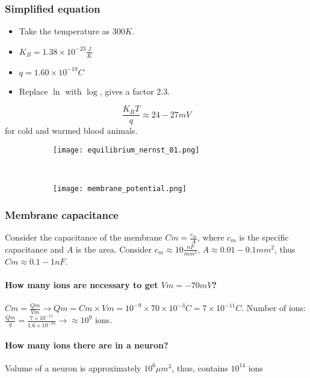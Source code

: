 \documentclass[main]{subfiles}
\begin{document}
\subsubsection{Simplified equation}
\begin{itemize}[noitemsep,nolistsep]
	\item Take the temperature as $300K$.
	\item $K_B = 1.38 \times 10^{-23} \frac{J}{K}$
	\item $q = 1.60 \times 10^{-19} C$
	\item Replace $\ln$ with $\log$, gives a factor $2.3$.
\end{itemize}

\[\frac{K_BT}{q} \approx 24 - 27 mV\] for cold and warmed blood animals.

\begin{figure}[H]
	\centering
	\begin{subfigure}[b]{0.5\textwidth}
		\centering
		\texttt{[image: equilibrium\_nernst\_01.png]}
	\end{subfigure}%
	~
	\begin{subfigure}[b]{0.3\textwidth}
		\centering
		\texttt{[image: membrane\_potential.png]}
	\end{subfigure}
\end{figure}

\subsubsection{Membrane capacitance}
Consider the capacitance of the membrane $Cm = \frac{c_m}{A}$, where $c_m$ is the specific capacitance and $A$ is the area. Consider $c_m \approx 10 \frac{nF}{mm^2}$, $A \approx 0.01 - 0.1 mm^2$, thus $Cm \approx 0.1 - 1 nF$.

\paragraph{How many ions are necessary to get $Vm = -70 mV$?}
$Cm = \frac{Qm}{Vm} \rightarrow Qm = Cm \times Vm = 10^{-9} \times 70 \times 10^{-3} C = 7 \times 10^{-11} C$.
Number of ions: $\frac{Qm}{q} = \frac{7\times 10^{-11}}{1.6 \times 10^{-19}} \rightarrow \approx 10^9$ ions.

\paragraph{How many ions there are in a neuron?}
Volume of a neuron is approximately $10^6 \mu m^3$, thus, contains $10^{14}$ ions
\end{document}
